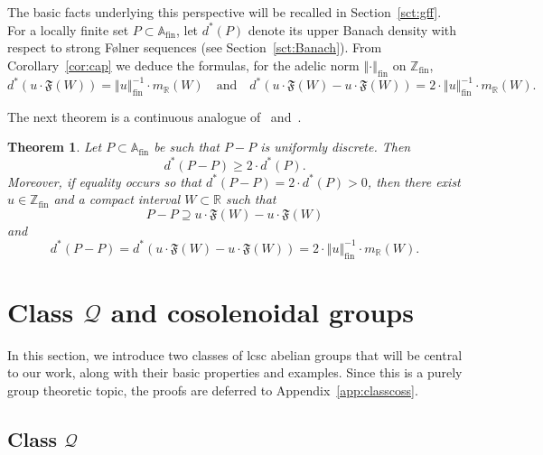 \documentclass{amsart}
\numberwithin{equation}{subsection}
\newtheorem{mainthm}{Theorem}
\theoremstyle{remark}
\begin{document}
The basic facts underlying this perspective will be recalled in Section~\ref{sct:gff}. For a locally finite set \(P\subset\mathbb{A}_{\mathrm{fin}}\), let \(d^{\ast}\left(P\right)\) denote its upper Banach density with respect to strong F\o lner sequences (see Section~\ref{sct:Banach}). From Corollary~\ref{cor:cap} we deduce the formulas, for the adelic norm \(\left\Vert\cdot\right\Vert_{\mathrm{fin}}\) on \(\mathbb{Z}_{\mathrm{fin}}\),
\begin{equation}\label{eq:densff}
d^{\ast}\left(u\cdot\mathfrak{F}\left(W\right)\right)=\left\Vert u\right\Vert_{\mathrm{fin}}^{-1}\cdot m_{\mathbb{R}}\left(W\right)\quad\text{and}\quad d^{\ast}\left(u\cdot\mathfrak{F}\left(W\right)-u\cdot\mathfrak{F}\left(W\right)\right)=2\cdot\left\Vert u\right\Vert_{\mathrm{fin}}^{-1}\cdot m_{\mathbb{R}}\left(W\right).
\end{equation}

The next theorem is a continuous analogue of~\cite[Theorem~1.16]{BjFi2019} and~\cite[Theorem~1.8]{BjFi2021}.

\begin{mainthm}\label{mthm:farey}
Let \(P\subset\mathbb{A}_{\mathrm{fin}}\) be such that \(P-P\) is uniformly discrete. Then
\[d^{\ast}\left(P-P\right)\geq 2\cdot d^{\ast}\left(P\right).\]
Moreover, if equality occurs so that \(d^{\ast}\left(P-P\right)=2\cdot d^{\ast}\left(P\right)>0\), then there exist \(u\in\mathbb{Z}_{\mathrm{fin}}\) and a compact interval \(W\subset\mathbb{R}\) such that
\[P-P\supseteq u\cdot\mathfrak{F}\left(W\right)-u\cdot\mathfrak{F}\left(W\right)\]
and
\[d^{\ast}\left(P-P\right)=d^{\ast}\left(u\cdot\mathfrak{F}\left(W\right)-u\cdot\mathfrak{F}\left(W\right)\right)=2\cdot\left\Vert u\right\Vert_{\mathrm{fin}}^{-1}\cdot m_{\mathbb{R}}\left(W\right).\]
\end{mainthm}

\section{Class \(\mathcal{Q}\) and cosolenoidal groups}

In this section, we introduce two classes of lcsc abelian groups that will be central to our work, along with their basic properties and examples. Since this is a purely group theoretic topic, the proofs are deferred to Appendix~\ref{app:classcoss}.

\subsection{Class \(\mathcal{Q}\)}\label{sct:classQ}
\end{document}
